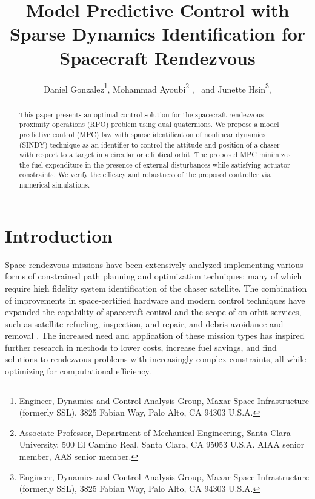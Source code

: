 \documentclass[letterpaper, preprint, paper,11pt]{AAS}	%
\begin{document}
\title{Model Predictive Control with Sparse Dynamics Identification for Spacecraft Rendezvous}

\author{Daniel Gonzalez\thanks{Engineer, Dynamics and Control Analysis Group, Maxar Space Infrastructure (formerly SSL), 3825 Fabian Way, Palo Alto, CA 94303 U.S.A.},
	 Mohammad Ayoubi\thanks{Associate Professor, Department of Mechanical Engineering, Santa Clara University, 500 El Camino Real,
	 	Santa Clara, CA 95053 U.S.A. AIAA senior member, AAS senior member.} , 
\ and Junette Hsin\thanks{Engineer, Dynamics and Control Analysis Group, Maxar Space Infrastructure (formerly SSL), 3825 Fabian Way, Palo Alto, CA 94303 U.S.A.}, 
}


\maketitle{} 		


\begin{abstract}
	
This paper presents an optimal control solution for the spacecraft rendezvous proximity operations (RPO) problem using dual quaternions. We propose a model predictive control (MPC) law with sparse identification of nonlinear dynamics (SINDY) technique as an identifier to control the attitude and position of a chaser with respect to a target in a circular or elliptical orbit. The proposed MPC minimizes the fuel expenditure in the presence of external disturbances while satisfying actuator constraints. We verify the efficacy and robustness of the proposed controller via numerical simulations.

\end{abstract}








\section{Introduction}
%

Space rendezvous missions have been extensively analyzed implementing various forms of constrained path planning and optimization techniques; many of which require high fidelity system identification of the chaser satellite. The combination of improvements in space-certified hardware and modern control techniques have expanded the capability of spacecraft control and the scope of on-orbit services, such as satellite refueling, inspection, and repair, and debris avoidance and removal \cite{ParkZagaris_AnalysisMPC,CairanoPark_MPCRPO}. The increased need and application of these mission types has inspired further research in methods to lower costs, increase fuel savings, and find solutions to rendezvous problems with increasingly complex constraints, all while optimizing for computational efficiency.
\end{document}
